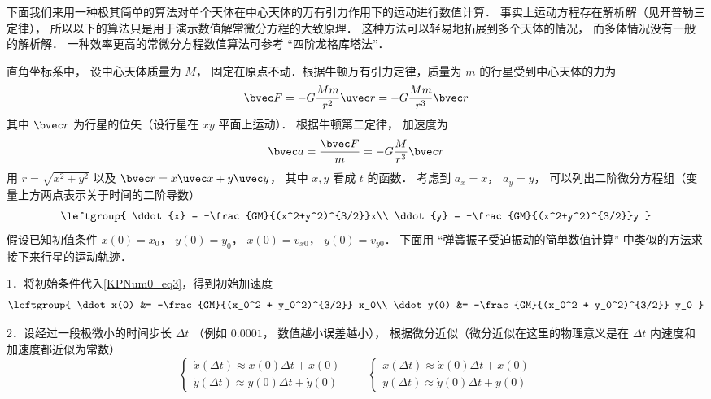 

下面我们来用一种极其简单的算法对单个天体在中心天体的万有引力作用下的运动进行数值计算． 事实上运动方程存在解析解（见开普勒三定律）， 所以以下的算法只是用于演示数值解常微分方程的大致原理． 这种方法可以轻易地拓展到多个天体的情况， 而多体情况没有一般的解析解． 一种效率更高的常微分方程数值算法可参考 “四阶龙格库塔法”．

直角坐标系中， 设中心天体质量为 $M$， 固定在原点不动．根据牛顿万有引力定律，质量为 $m$ 的行星受到中心天体的力为
\begin{equation}
\bvec F = -G \frac{Mm}{r^2}\uvec r = -G\frac{Mm}{r^3} \bvec r
\end{equation}
其中 $\bvec r$ 为行星的位矢（设行星在 $xy$ 平面上运动）． 根据牛顿第二定律， 加速度为
\begin{equation}
\bvec a = \frac{\bvec F}{m} = -G\frac{M}{r^3} \bvec r
\end{equation}
用 $r = \sqrt{x^2+y^2}$ 以及 $\bvec r = x\uvec x + y\uvec y$， 其中 $x,y$ 看成 $t$ 的函数． 考虑到 $a_x = \ddot x$， $a_y = \ddot y$， 可以列出二阶微分方程组（变量上方两点表示关于时间的二阶导数）
\begin{equation}\label{KPNum0_eq3}
\leftgroup{
\ddot{x} = -\frac{GM}{(x^2+y^2)^{3/2}}x\\
\ddot{y} = -\frac{GM}{(x^2+y^2)^{3/2}}y
}\end{equation}
假设已知初值条件 $x(0) = x_0$， $y(0) = y_0$， $\dot x(0) = v_{x0}$， $\dot y(0) = v_{y0}$． 下面用 “弹簧振子受迫振动的简单数值计算” 中类似的方法求接下来行星的运动轨迹．

1．将初始条件代入\autoref{KPNum0_eq3}，得到初始加速度
\begin{equation}
\leftgroup{
\ddot x(0) &= -\frac{GM}{(x_0^2 + y_0^2)^{3/2}} x_0\\
\ddot y(0) &= -\frac{GM}{(x_0^2 + y_0^2)^{3/2}} y_0
}
\end{equation}
 
2．设经过一段极微小的时间步长 $\Delta t$ （例如 $0.0001$， 数值越小误差越小）， 根据微分近似（微分近似在这里的物理意义是在 $\Delta t$ 内速度和加速度都近似为常数）
\begin{equation}
\begin{cases}
\dot x(\Delta t) \approx \ddot x(0)\Delta t + x(0)\\
\dot y(\Delta t) \approx \ddot y(0)\Delta t + \dot y(0)
\end{cases}
\qquad
\begin{cases}
x(\Delta t) \approx \dot x(0)\Delta t + x(0)\\
y(\Delta t) \approx \dot y(0)\Delta t + y(0)
\end{cases}
\end{equation}

